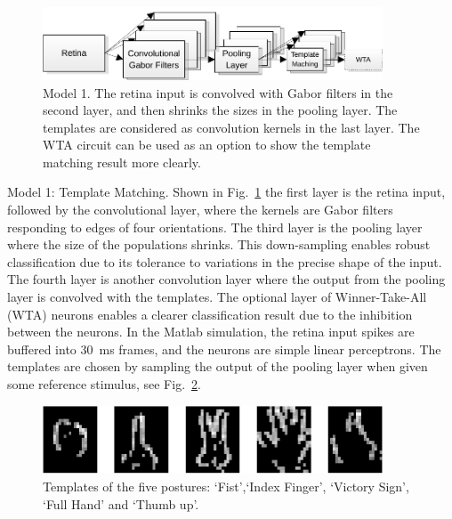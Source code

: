 \begin{figure}
\centering
	\includegraphics[width=0.9\textwidth]{pics_icann/model1.pdf}
	\caption{Model 1. 
	The retina input is convolved with Gabor filters in the second layer, and then shrinks the sizes in the pooling layer.
	The templates are considered as convolution kernels in the last layer.
	The WTA circuit can be used as an option to show the template matching result more clearly.
	}
	\label{fig:model1}
\end{figure}

Model 1: Template Matching. Shown in Fig.~\ref{fig:model1} the first layer is the retina input, followed by the convolutional layer, where the kernels are Gabor filters responding to edges of four orientations.
The third layer is the pooling layer where the size of the populations shrinks. 
This down-sampling enables robust classification due to its tolerance to variations in the precise shape of the input. 
The fourth layer is another convolution layer where the output from the pooling layer is convolved with the templates.
The optional layer of Winner-Take-All (WTA) neurons enables a clearer classification result due to the inhibition between the neurons.
In the Matlab simulation, the retina input spikes are buffered into 30~ms frames, and the neurons are simple linear perceptrons.
The templates are chosen by sampling the output of the pooling layer when given some reference stimulus, see Fig.~\ref{fig:template}.

\begin{figure}
\centering
	\includegraphics[width=0.9\textwidth]{pics_icann/gesture.pdf}
	\caption{Templates of the five postures: `Fist',`Index Finger', `Victory Sign', `Full Hand' and `Thumb up'.}
	\label{fig:template}
\end{figure}

